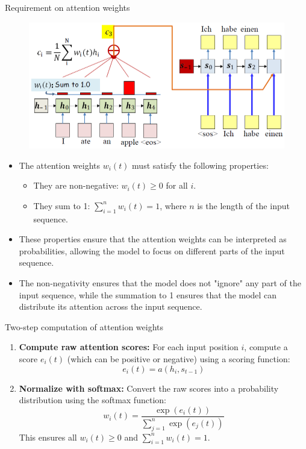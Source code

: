 \begin{frame}[allowframebreaks]{Requirement on attention weights}
    \begin{figure}
        \centering
        \includegraphics[width=\linewidth, height=0.6\textheight,keepaspectratio]{images/nlp/attention-weights-requirement.png}
    \end{figure}
    \begin{itemize}
        \setlength{\itemsep}{-0.5em}
        \item The attention weights $w_i(t)$ must satisfy the following properties:
        \begin{itemize}
            \item They are non-negative: $w_i(t) \geq 0$ for all $i$.
            \item They sum to 1: $\sum_{i=1}^{n} w_i(t) = 1$, where $n$ is the length of the input sequence.
        \end{itemize}
        \item These properties ensure that the attention weights can be interpreted as probabilities, allowing the model to focus on different parts of the input sequence.
        \item The non-negativity ensures that the model does not "ignore" any part of the input sequence, while the summation to 1 ensures that the model can distribute its attention across the input sequence.
    \end{itemize}
    \framebreak

    \begin{block}{\large Two-step computation of attention weights} \\[1em]
        \begin{enumerate}
            \item \textbf{Compute raw attention scores:} For each input position $i$, compute a score $e_i(t)$ (which can be positive or negative) using a scoring function:
            \[
            e_i(t) = a(h_i, s_{t-1})
            \]
            \item \textbf{Normalize with softmax:} Convert the raw scores into a probability distribution using the softmax function:
            \[
            w_i(t) = \frac{\exp(e_i(t))}{\sum_{j=1}^{n} \exp(e_j(t))}
            \]
            This ensures all $w_i(t) \geq 0$ and $\sum_{i=1}^n w_i(t) = 1$.
        \end{enumerate}
    \end{block}
\end{frame}


